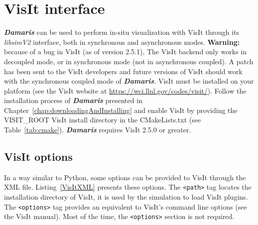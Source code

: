 \documentclass[11pt]{report}
\newcommand{\Damaris}{\emph{\textbf{Damaris}}}
\begin{document}
\chapter{VisIt interface}\label{chap:VisIt}

\Damaris{} can be used to perform in-situ visualization with VisIt through its \emph{libsimV2} interface, 
both in synchronous and asynchronous modes. \textbf{Warning:} because of a bug in VisIt (as of version 2.5.1),
The VisIt backend only works in decoupled mode, or in synchronous mode (not in asynchronous coupled).
A patch has been sent to the VisIt developers and future versions of VisIt should work with the
synchronous coupled mode of \Damaris{}.
VisIt must be installed on your platform (see the VisIt website at \url{https://wci.llnl.gov/codes/visit/}).
Follow the installation process of \Damaris{} presented in Chapter~\ref{chap:downloadingAndInstalling}
and enable VisIt by providing the VISIT\_ROOT 
VisIt install directory in the CMakeLists.txt (see Table~\ref{tab:cmake}).
\Damaris{} requires VisIt 2.5.0 or greater.

\section{VisIt options}

In a way similar to Python, some options can be provided to VisIt through the XML file.
Listing~\ref{VisItXML} presents these options. The \texttt{<path>} tag locates the installation
directory of VisIt, it is used by the simulation to load VisIt plugins.
The \texttt{<options>} tag provides an equivalent to VisIt's command line options (see
the VisIt manual). Most of the time, the \texttt{<options>} section is not required.

\noindent\begin{minipage}{\textwidth}
\vspace{0.5cm}

\end{minipage}
\end{document}
